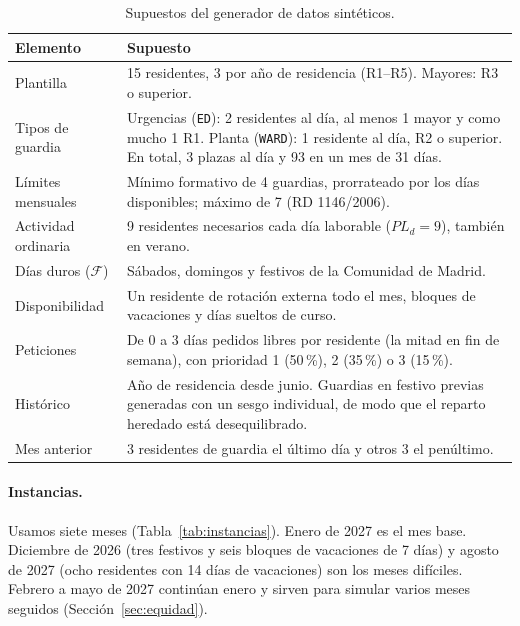 \begin{table}[ht]
\centering\small
\caption{Supuestos del generador de datos sintéticos.}
\label{tab:supuestos}
\begin{tabularx}{\linewidth}{@{}p{3.1cm}X@{}}
\toprule
Elemento & Supuesto \\
\midrule
Plantilla & 15 residentes, 3 por año de residencia (R1--R5). Mayores: R3 o superior. \\
Tipos de guardia & Urgencias (\texttt{ED}): 2 residentes al día, al menos 1 mayor y como mucho 1 R1. Planta (\texttt{WARD}): 1 residente al día, R2 o superior. En total, 3 plazas al día y 93 en un mes de 31 días. \\
Límites mensuales & Mínimo formativo de 4 guardias, prorrateado por los días disponibles; máximo de 7 (RD 1146/2006). \\
Actividad ordinaria & 9 residentes necesarios cada día laborable ($PL_d = 9$), también en verano. \\
Días duros ($\mathcal{F}$) & Sábados, domingos y festivos de la Comunidad de Madrid. \\
Disponibilidad & Un residente de rotación externa todo el mes, bloques de vacaciones y días sueltos de curso. \\
Peticiones & De 0 a 3 días pedidos libres por residente (la mitad en fin de semana), con prioridad 1 (50\,\%), 2 (35\,\%) o 3 (15\,\%). \\
Histórico & Año de residencia desde junio. Guardias en festivo previas generadas con un sesgo individual, de modo que el reparto heredado está desequilibrado. \\
Mes anterior & 3 residentes de guardia el último día y otros 3 el penúltimo. \\
\bottomrule
\end{tabularx}
\end{table}

\paragraph{Instancias.} Usamos siete meses (Tabla~\ref{tab:instancias}). Enero de 2027 es el mes base. Diciembre de 2026 (tres festivos y seis bloques de vacaciones de 7 días) y agosto de 2027 (ocho residentes con 14 días de vacaciones) son los meses difíciles. Febrero a mayo de 2027 continúan enero y sirven para simular varios meses seguidos (Sección~\ref{sec:equidad}).



